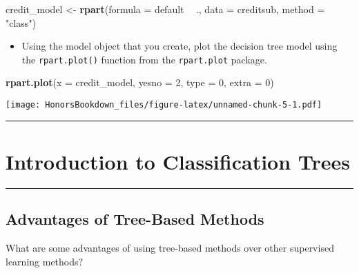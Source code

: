 \documentclass[
]{book}
\newenvironment{Shaded}{\begin{snugshade}}{\end{snugshade}}
\newcommand{\DataTypeTok}[1]{\textcolor[rgb]{0.13,0.29,0.53}{#1}}
\newcommand{\DecValTok}[1]{\textcolor[rgb]{0.00,0.00,0.81}{#1}}
\newcommand{\KeywordTok}[1]{\textcolor[rgb]{0.13,0.29,0.53}{\textbf{#1}}}
\newcommand{\NormalTok}[1]{#1}
\newcommand{\OperatorTok}[1]{\textcolor[rgb]{0.81,0.36,0.00}{\textbf{#1}}}
\newcommand{\StringTok}[1]{\textcolor[rgb]{0.31,0.60,0.02}{#1}}
\providecommand{\tightlist}{%
  \setlength{\itemsep}{0pt}\setlength{\parskip}{0pt}}
\begin{document}
\begin{Shaded}
\begin{Highlighting}[]
\NormalTok{credit_model <-}\StringTok{ }\KeywordTok{rpart}\NormalTok{(}\DataTypeTok{formula =}\NormalTok{ default }\OperatorTok{~}\StringTok{ }\NormalTok{., }
                      \DataTypeTok{data =}\NormalTok{ creditsub, }
                      \DataTypeTok{method =} \StringTok{"class"}\NormalTok{)}
\end{Highlighting}
\end{Shaded}

\begin{itemize}
\tightlist
\item
  Using the model object that you create, plot the decision tree model using the \texttt{rpart.plot()} function from the \texttt{rpart.plot} package.
\end{itemize}

\begin{Shaded}
\begin{Highlighting}[]
\KeywordTok{rpart.plot}\NormalTok{(}\DataTypeTok{x =}\NormalTok{ credit_model, }\DataTypeTok{yesno =} \DecValTok{2}\NormalTok{, }\DataTypeTok{type =} \DecValTok{0}\NormalTok{, }\DataTypeTok{extra =} \DecValTok{0}\NormalTok{)}
\end{Highlighting}
\end{Shaded}

\texttt{[image: HonorsBookdown\_files/figure-latex/unnamed-chunk-5-1.pdf]}

\begin{center}\rule{0.5\linewidth}{0.5pt}\end{center}

\hypertarget{introduction-to-classification-trees}{%
\section{Introduction to Classification Trees}\label{introduction-to-classification-trees}}

\begin{center}\rule{0.5\linewidth}{0.5pt}\end{center}

\hypertarget{advantages-of-tree-based-methods}{%
\subsection{Advantages of Tree-Based Methods}\label{advantages-of-tree-based-methods}}

What are some advantages of using tree-based methods over other supervised learning methods?
\end{document}
